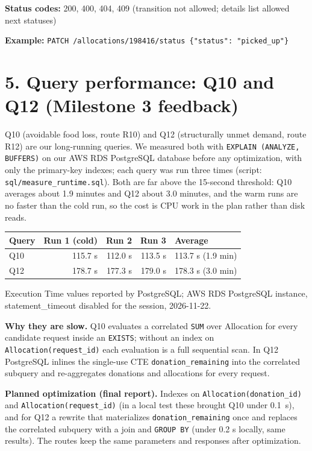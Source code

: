 \documentclass[11pt,letterpaper]{article}
\newcommand{\brk}{\penalty0\relax}
\newcommand{\kv}[2]{\textbf{#1:} #2\par}
\begin{document}
\kv{Status codes}{200, 400, 404, 409 (transition not allowed; details list allowed next statuses)}
{\raggedright\textbf{Example:} {\small \texttt{PATCH /\brk{}allocations/\brk{}198416/\brk{}status  \{"status": "picked\_up"\}}}\par}

\section*{5. Query performance: Q10 and Q12 (Milestone 3 feedback)}

Q10 (avoidable food loss, route R10) and Q12 (structurally unmet demand, route R12) are our long-running queries. We measured both with \texttt{EXPLAIN (ANALYZE, BUFFERS)} on our AWS RDS PostgreSQL database before any optimization, with only the primary-key indexes; each query was run three times (script: \texttt{sql/measure\_runtime.sql}). Both are far above the 15-second threshold: Q10 averages about 1.9 minutes and Q12 about 3.0 minutes, and the warm runs are no faster than the cold run, so the cost is CPU work in the plan rather than disk reads.

\begin{xltabular}{\linewidth}{l r r r X}

\toprule

\textbf{Query} & \textbf{Run 1 (cold)} & \textbf{Run 2} & \textbf{Run 3} & \textbf{Average} \\

\midrule

Q10 & 115.7 s & 112.0 s & 113.5 s & 113.7 s (1.9 min) \\

Q12 & 178.7 s & 177.3 s & 179.0 s & 178.3 s (3.0 min) \\

\bottomrule

\end{xltabular}

Execution Time values reported by PostgreSQL; AWS RDS PostgreSQL instance, statement\_timeout disabled for the session, 2026-11-22.

\textbf{Why they are slow.} Q10 evaluates a correlated \texttt{SUM} over Allocation for every candidate request inside an \texttt{EXISTS}; without an index on \texttt{Allocation(request\_id)} each evaluation is a full sequential scan. In Q12 PostgreSQL inlines the single-use CTE \texttt{donation\_remaining} into the correlated subquery and re-aggregates donations and allocations for every request.

\textbf{Planned optimization (final report).} Indexes on \texttt{Allocation(\brk{}donation\_id)} and \texttt{Allocation(\brk{}request\_id)} (in a local test these brought Q10 under 0.1~s), and for Q12 a rewrite that materializes \texttt{donation\_remaining} once and replaces the correlated subquery with a join and \texttt{GROUP BY} (under 0.2 s locally, same results). The routes keep the same parameters and responses after optimization.
\end{document}
